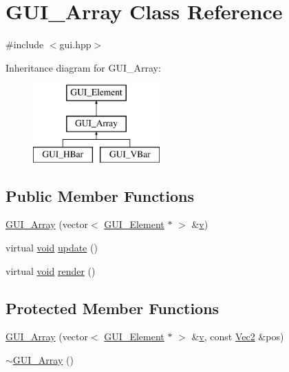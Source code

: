 \hypertarget{class_g_u_i___array}{\section{G\-U\-I\-\_\-\-Array Class Reference}
\label{class_g_u_i___array}
}


{\ttfamily \#include $<$gui.\-hpp$>$}

Inheritance diagram for G\-U\-I\-\_\-\-Array\-:\begin{figure}[H]
\begin{center}
\leavevmode
\includegraphics[height=3.000000cm]{class_g_u_i___array}
\end{center}
\end{figure}
\subsection*{Public Member Functions}
\begin{DoxyCompactItemize}
\item 
\hyperlink{class_g_u_i___array_a53eb1af393692d1d7da08d2c74bc69b0}{G\-U\-I\-\_\-\-Array} (vector$<$ \hyperlink{class_g_u_i___element}{G\-U\-I\-\_\-\-Element} $\ast$ $>$ \&\hyperlink{_s_d_l__opengl_8h_a10a82eabcb59d2fcd74acee063775f90}{v})
\item 
virtual \hyperlink{_s_d_l__opengles2__gl2ext_8h_ae5d8fa23ad07c48bb609509eae494c95}{void} \hyperlink{class_g_u_i___array_a1cfd57bb71970a0e793139df7da101ee}{update} ()
\item 
virtual \hyperlink{_s_d_l__opengles2__gl2ext_8h_ae5d8fa23ad07c48bb609509eae494c95}{void} \hyperlink{class_g_u_i___array_a3b39cb4889990e9316d996d1dff7a725}{render} ()
\end{DoxyCompactItemize}
\subsection*{Protected Member Functions}
\begin{DoxyCompactItemize}
\item 
\hyperlink{class_g_u_i___array_a0e8a4333a364d08662bdde15fd27b336}{G\-U\-I\-\_\-\-Array} (vector$<$ \hyperlink{class_g_u_i___element}{G\-U\-I\-\_\-\-Element} $\ast$ $>$ \&\hyperlink{_s_d_l__opengl_8h_a10a82eabcb59d2fcd74acee063775f90}{v}, const \hyperlink{class_vec2}{Vec2} \&pos)
\item 
\hyperlink{class_g_u_i___array_ab4fb008f7955c59fb6ee2319dd24be5c}{$\sim$\-G\-U\-I\-\_\-\-Array} ()
\end{DoxyCompactItemize}
